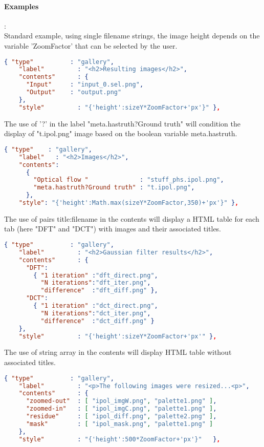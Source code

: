 \paragraph{Examples}:\\
Standard example, using single filename strings, the image height depends on
the variable 'ZoomFactor' that can be selected by the user.
\begin{lstlisting}[language=json,firstnumber=1]
  { "type"          : "gallery",
    "label"         : "<h2>Resulting images</h2>",
    "contents"      : { 
      "Input"     : "input_0.sel.png", 
      "Output"    : "output.png"
    },
    "style"         : "{'height':sizeY*ZoomFactor+'px'}" },
\end{lstlisting}
The use of '?' in the label "meta.hastruth?Ground truth" will condition the 
display of "t.ipol.png" image based on the boolean variable meta.hastruth.
\begin{lstlisting}[language=json,firstnumber=1]
  { "type"    : "gallery",
    "label"   : "<h2>Images</h2>",
    "contents": 
      {
        "Optical flow "              : "stuff_phs.ipol.png", 
        "meta.hastruth?Ground truth" : "t.ipol.png",
      },
    "style": "{'height':Math.max(sizeY*ZoomFactor,350)+'px'}" },
\end{lstlisting}
The use of pairs title:filename in the contents will display a HTML table
for each tab (here "DFT" and "DCT") with images and their associated titles.
\begin{lstlisting}[language=json,firstnumber=1]
  { "type"          : "gallery",
    "label"         : "<h2>Gaussian filter results</h2>",
    "contents"      : { 
      "DFT":
        { "1 iteration" :"dft_direct.png", 
          "N iterations":"dft_iter.png", 
          "difference"  :"dft_diff.png" }, 
      "DCT":                     
        { "1 iteration" :"dct_direct.png", 
          "N iterations":"dct_iter.png",
          "difference"  :"dct_diff.png" }
    },
    "style"         : "{'height':sizeY*ZoomFactor+'px'" },
\end{lstlisting}
The use of string array in the contents will display HTML table without associated
titles.
\begin{lstlisting}[language=json,firstnumber=1]
  { "type"          : "gallery",
    "label"         : "<p>The following images were resized...<p>",
    "contents"      : { 
      "zoomed-out"  : [ "ipol_imgW.png", "palette1.png" ],
      "zoomed-in"   : [ "ipol_imgC.png", "palette1.png" ],
      "residue"     : [ "ipol_diff.png", "palette2.png" ],
      "mask"        : [ "ipol_mask.png", "palette1.png" ]
    },
    "style"         : "{'height':500*ZoomFactor+'px'}"   },
\end{lstlisting}


